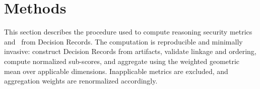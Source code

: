 \section{Methods}
\label{sec:methods}
This section describes the procedure used to compute reasoning security metrics and \RSS\ from Decision Records. The computation is reproducible and minimally invasive: construct Decision Records from artifacts, validate linkage and ordering, compute normalized sub-scores, and aggregate using the weighted geometric mean over applicable dimensions. Inapplicable metrics are excluded, and aggregation weights are renormalized accordingly.
